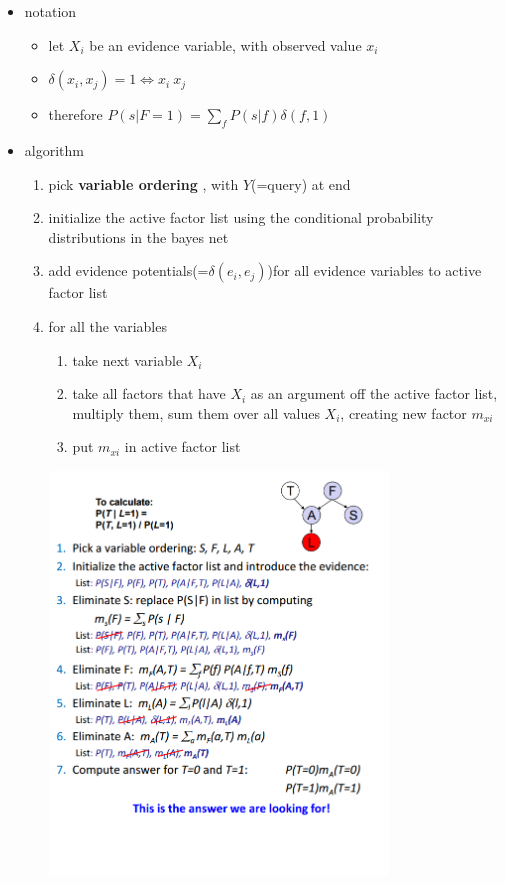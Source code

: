 \documentclass[11pt]{article}
\newcommand{\ee}[1]{\ensuremath{#1}}
\begin{document}
\begin{description}
\begin{itemize}
\begin{itemize}
		\item notation
		\begin{itemize}
			\item let \ee{X_i} be an evidence variable, with observed value \ee{x_i}
			\item \ee{\delta(x_i,x_j) = 1 \iff x_i \ x_j}
			\item therefore \ee{P(s \vert F=1) = \sum_{f}^{}P(s \vert f) \delta (f,1)}
		\end{itemize}
	
		\item algorithm 
		\begin{enumerate}
			\item pick \textbf{variable ordering }, with \ee{Y}(=query) at end
			\item initialize the active factor list using the conditional probability distributions in the bayes net
			\item add evidence potentials(=\ee{\delta (e_i,e_j)})for all evidence variables to active factor list
			\item for all the variables
			\begin{enumerate}
				\item take next variable \ee{X_i}
				\item take all factors that have \ee{X_i} as an argument off the active factor list, multiply them, sum them over all values \ee{X_i}, creating new factor \ee{m_{xi}}
				\item put \ee{m_{xi}} in active factor list
			\end{enumerate}
		
			\includegraphics[width=90mm,scale=1]{variable_elim}
			

\end{enumerate}
\end{itemize}
\end{itemize}
\end{description}
\end{document}
